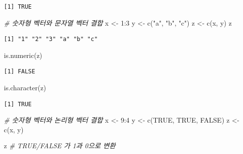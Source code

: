 \documentclass[
  11pt,
]{krantz}
\newenvironment{Shaded}{\begin{snugshade}}{\end{snugshade}}
\newcommand{\CommentTok}[1]{\textcolor[rgb]{0.37,0.37,0.37}{\textit{#1}}}
\newcommand{\ConstantTok}[1]{\textcolor[rgb]{0,0,0}{#1}}
\newcommand{\DecValTok}[1]{\textcolor[rgb]{0.06,0.06,0.06}{#1}}
\newcommand{\FunctionTok}[1]{\textcolor[rgb]{0,0,0}{#1}}
\newcommand{\NormalTok}[1]{#1}
\newcommand{\OtherTok}[1]{\textcolor[rgb]{0.37,0.37,0.37}{#1}}
\newcommand{\SpecialCharTok}[1]{\textcolor[rgb]{0,0,0}{#1}}
\newcommand{\StringTok}[1]{\textcolor[rgb]{0.5,0.5,0.5}{#1}}
\begin{document}
\begin{verbatim}
[1] TRUE
\end{verbatim}

\begin{Shaded}
\begin{Highlighting}[]
\CommentTok{\# 숫자형 벡터와 문자열 벡터 결합}
\NormalTok{x }\OtherTok{\textless{}{-}} \DecValTok{1}\SpecialCharTok{:}\DecValTok{3}
\NormalTok{y }\OtherTok{\textless{}{-}} \FunctionTok{c}\NormalTok{(}\StringTok{"a"}\NormalTok{, }\StringTok{"b"}\NormalTok{, }\StringTok{"c"}\NormalTok{)}
\NormalTok{z }\OtherTok{\textless{}{-}} \FunctionTok{c}\NormalTok{(x, y)}
\NormalTok{z}
\end{Highlighting}
\end{Shaded}

\begin{verbatim}
[1] "1" "2" "3" "a" "b" "c"
\end{verbatim}

\begin{Shaded}
\begin{Highlighting}[]
\FunctionTok{is.numeric}\NormalTok{(z)}
\end{Highlighting}
\end{Shaded}

\begin{verbatim}
[1] FALSE
\end{verbatim}

\begin{Shaded}
\begin{Highlighting}[]
\FunctionTok{is.character}\NormalTok{(z)}
\end{Highlighting}
\end{Shaded}

\begin{verbatim}
[1] TRUE
\end{verbatim}

\begin{Shaded}
\begin{Highlighting}[]
\CommentTok{\# 숫자형 벡터와 논리형 벡터 결합}
\NormalTok{x }\OtherTok{\textless{}{-}} \DecValTok{9}\SpecialCharTok{:}\DecValTok{4}
\NormalTok{y }\OtherTok{\textless{}{-}} \FunctionTok{c}\NormalTok{(}\ConstantTok{TRUE}\NormalTok{, }\ConstantTok{TRUE}\NormalTok{, }\ConstantTok{FALSE}\NormalTok{)}
\NormalTok{z }\OtherTok{\textless{}{-}} \FunctionTok{c}\NormalTok{(x, y)}

\NormalTok{z }\CommentTok{\# TRUE/FALSE 가 1과 0으로 변환}
\end{Highlighting}
\end{Shaded}
\end{document}
